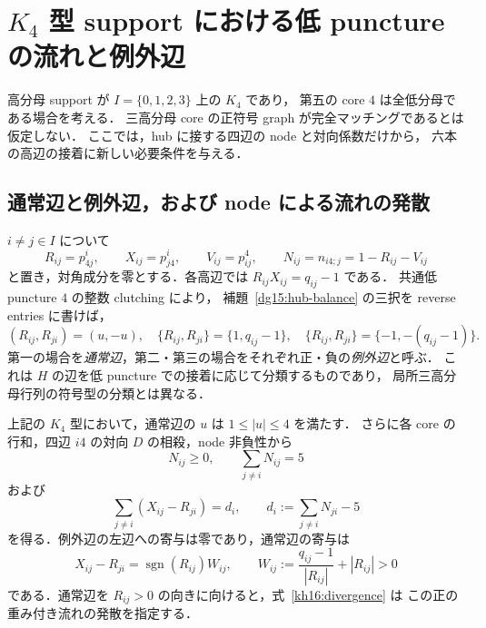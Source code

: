 \section{\texorpdfstring{$K_4$}{K4} 型 support における低 puncture の流れと例外辺}
\label{kh16:section}

高分母 support が $I=\{0,1,2,3\}$ 上の $K_4$ であり，
第五の core $4$ は全低分母である場合を考える．
三高分母 core の正符号 graph が完全マッチングであるとは仮定しない．
ここでは，hub に接する四辺の node と対向係数だけから，
六本の高辺の接着に新しい必要条件を与える．

\subsection{通常辺と例外辺，および node による流れの発散}

\begin{definition}\label{kh16:notation}
$i\ne j\in I$ について
\[
 R_{ij}=p^i_{4j},\qquad X_{ij}=p^i_{j4},\qquad
 V_{ij}=p^4_{ij},\qquad N_{ij}=n_{i4;j}=1-R_{ij}-V_{ij}
\]
と置き，対角成分を零とする．各高辺では $R_{ij}X_{ij}=q_{ij}-1$ である．
共通低 puncture $4$ の整数 clutching により，
補題~\ref{dg15:hub-balance} の三択を reverse entries に書けば，
\begin{equation}\label{kh16:edge-options}
 (R_{ij},R_{ji})=(u,-u),\quad
 \{R_{ij},R_{ji}\}=\{1,q_{ij}-1\},\quad
 \{R_{ij},R_{ji}\}=\{-1,-(q_{ij}-1)\}.
\end{equation}
第一の場合を\emph{通常辺}，第二・第三の場合をそれぞれ正・負の\emph{例外辺}と呼ぶ．
これは $H$ の辺を低 puncture での接着に応じて分類するものであり，
局所三高分母行列の符号型の分類とは異なる．
\end{definition}

\begin{lemma}
\label{kh16:flow}
上記の $K_4$ 型において，通常辺の $u$ は $1\leq |u|\leq4$ を満たす．
さらに各 core の行和，四辺 $i4$ の対向 $D$ の相殺，node 非負性から
\begin{equation}\label{kh16:node-budget}
 N_{ij}\geq0,\qquad \sum_{j\ne i}N_{ij}=5
\end{equation}
および
\begin{equation}\label{kh16:divergence}
 \sum_{j\ne i}(X_{ij}-R_{ji})=d_i,
 \qquad d_i:=\sum_{j\ne i}N_{ji}-5
\end{equation}
を得る．例外辺の左辺への寄与は零であり，通常辺の寄与は
\begin{equation}\label{kh16:edge-weight}
 X_{ij}-R_{ji}
 =\operatorname{sgn}(R_{ij})W_{ij},\qquad
 W_{ij}:=\frac{q_{ij}-1}{|R_{ij}|}+|R_{ij}|>0
\end{equation}
である．通常辺を $R_{ij}>0$ の向きに向けると，式~\eqref{kh16:divergence} は
この正の重み付き流れの発散を指定する．
\end{lemma}

